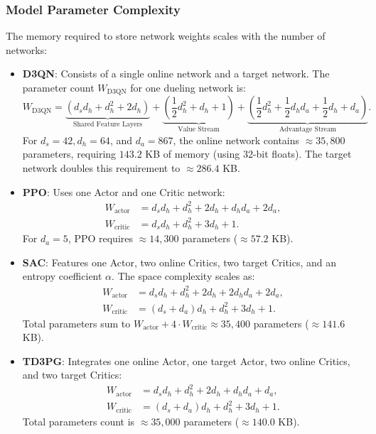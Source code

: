 \subsubsection{Model Parameter Complexity}
The memory required to store network weights scales with the number of networks:
\begin{itemize}
    \item \textbf{D3QN}: Consists of a single online network and a target network. The parameter count $W_{\text{D3QN}}$ for one dueling network is:
    \begin{equation}
        W_{\text{D3QN}} = \underbrace{(d_s d_h + d_h^2 + 2d_h)}_{\text{Shared Feature Layers}} + \underbrace{\left( \frac{1}{2} d_h^2 + d_h + 1 \right)}_{\text{Value Stream}} + \underbrace{\left( \frac{1}{2} d_h^2 + \frac{1}{2} d_h d_a + \frac{1}{2} d_h + d_a \right)}_{\text{Advantage Stream}}.
    \end{equation}
    For $d_s = 42, d_h = 64$, and $d_a = 867$, the online network contains $\approx 35,800$ parameters, requiring $143.2$ KB of memory (using 32-bit floats). The target network doubles this requirement to $\approx 286.4$ KB.
    
    \item \textbf{PPO}: Uses one Actor and one Critic network:
    \begin{align}
        W_{\text{actor}} &= d_s d_h + d_h^2 + 2d_h + d_h d_a + 2d_a, \\
        W_{\text{critic}} &= d_s d_h + d_h^2 + 3d_h + 1.
    \end{align}
    For $d_a = 5$, PPO requires $\approx 14,300$ parameters ($\approx 57.2$ KB).
    
    \item \textbf{SAC}: Features one Actor, two online Critics, two target Critics, and an entropy coefficient $\alpha$. The space complexity scales as:
    \begin{align}
        W_{\text{actor}} &= d_s d_h + d_h^2 + 2d_h + 2d_h d_a + 2d_a, \\
        W_{\text{critic}} &= (d_s + d_a) d_h + d_h^2 + 3d_h + 1.
    \end{align}
    Total parameters sum to $W_{\text{actor}} + 4 \cdot W_{\text{critic}} \approx 35,400$ parameters ($\approx 141.6$ KB).
    
    \item \textbf{TD3PG}: Integrates one online Actor, one target Actor, two online Critics, and two target Critics:
    \begin{align}
        W_{\text{actor}} &= d_s d_h + d_h^2 + 2d_h + d_h d_a + d_a, \\
        W_{\text{critic}} &= (d_s + d_a) d_h + d_h^2 + 3d_h + 1.
    \end{align}
    Total parameters count is $\approx 35,000$ parameters ($\approx 140.0$ KB).
\end{itemize}

